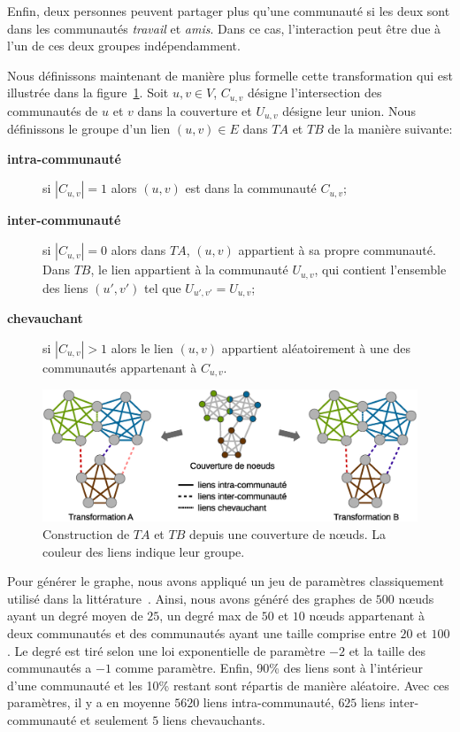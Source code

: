 Enfin, deux personnes peuvent partager plus qu'une communauté si les deux sont dans les communautés \emph{travail} et \emph{amis}.
Dans ce cas, l'interaction peut être due à l'un de ces deux groupes indépendamment.

Nous définissons maintenant de manière plus formelle cette transformation qui est illustrée dans la figure~\ref{fig:Trans}.
Soit $u,v \in V$, $C_{u,v}$ désigne l'intersection des communautés de $u$ et $v$ dans la couverture et $U_{u,v}$ désigne leur union.
Nous définissons le groupe d'un lien $(u,v) \in E$ dans $TA$ et $TB$ de la manière suivante:
\begin{description}
\item[\textbf{intra-communauté}] si $|C_{u,v}| = 1$ alors $(u,v)$ est dans la communauté $C_{u,v}$;
\item[\textbf{inter-communauté}] si $|C_{u,v}| = 0$ alors dans $TA$, $(u,v)$ appartient à sa propre communauté.
Dans $TB$, le lien appartient à la communauté $U_{u,v}$, qui contient l'ensemble des liens $(u',v')$ tel que $U_{u',v'}=U_{u,v}$;
\item[\textbf{chevauchant}] si $|C_{u,v}| > 1$ alors le lien $(u,v)$ appartient aléatoirement à une des communautés appartenant à $C_{u,v}$.
\end{description}

\begin{figure}
\centering
\includegraphics[width=0.9\linewidth]{img/ExpectedNodes/Example/GroundTruthTransformation}
\caption{Construction de $TA$ et $TB$ depuis une couverture de n\oe{}uds.
La couleur des liens indique leur groupe.}
\label{fig:Trans}
\end{figure}

Pour générer le graphe, nous avons appliqué un jeu de paramètres classiquement utilisé dans la littérature~\cite{Fortunato2010}.
Ainsi, nous avons généré des graphes de $500$ n\oe{}uds ayant un degré moyen de $25$, un degré max de $50$ et $10$ n\oe{}uds appartenant à deux communautés et des communautés ayant une taille comprise entre $20$ et $100$.
Le degré est tiré selon une loi exponentielle de paramètre $-2$ et la taille des communautés a $-1$ comme paramètre.
Enfin, 90\% des liens sont à l'intérieur d'une communauté et les 10\% restant sont répartis de manière aléatoire.
Avec ces paramètres, il y a en moyenne $5620$ liens intra-communauté, $625$ liens inter-communauté et seulement $5$ liens chevauchants.

